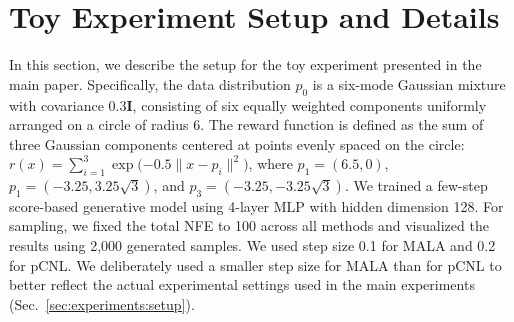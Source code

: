 \section{Toy Experiment Setup and Details}
\vspace{-0.3cm}
\label{sec:appx:toy exp setup and details}
In this section, we describe the setup for the toy experiment presented in the main paper. Specifically, the data distribution $p_0$ is a six-mode Gaussian mixture with covariance $0.3\mathbf{I}$, consisting of six equally weighted components uniformly arranged on a circle of radius 6. The reward function is defined as the sum of three Gaussian components centered at points evenly spaced on the circle: $r(x)=\sum_{i=1}^3\exp{(-0.5\|x-p_i \|^2})$, where $p_1=(6.5,0)$, $p_1=(-3.25, 3.25\sqrt{3})$, and $p_3=(-3.25, -3.25\sqrt{3})$. We trained a few-step score-based generative model using 4-layer MLP with hidden dimension 128. For sampling, we fixed the total NFE to 100 across all methods and visualized the results using 2,000 generated samples. We used step size 0.1 for MALA and 0.2 for pCNL. We deliberately used a smaller step size for MALA than for pCNL to better reflect the actual experimental settings used in the main experiments (Sec.~\ref{sec:experiments:setup}).
